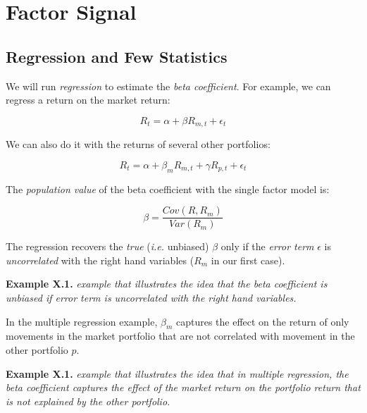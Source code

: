 \chapter{Factor Signal}

\section{Regression and Few Statistics}

We will run \textit{regression} to estimate the 
\textit{beta coefficient}. For example, we can 
regress a return on the market return:

\begin{equation}
    R_{t} = \alpha + \beta R_{m,t} + \epsilon_{t}
\end{equation}

We can also do it with the returns of several other portfolios:

\begin{equation}
    R_{t} = \alpha + \beta_m R_{m,t} + \gamma R_{p,t} + \epsilon_{t}
\end{equation}

The \textit{population value} of the beta coefficient with the single factor model is:

\begin{equation}
    \beta = \frac{Cov(R,R_m)}{Var(R_m)}
\end{equation}

The regression recovers the \textit{true} (\textit{i.e.} unbiased) 
$\beta$ only if the \textit{error term} $\epsilon$ is \textit{uncorrelated}
with the right hand variables ($R_m$ in our first case).

\begin{examplebox}
    \textbf{Example X.1.} 
    \textit{example that illustrates the idea
    that the beta coefficient is unbiased if 
    error term is uncorrelated with the right hand variables.}
\end{examplebox}

In the multiple regression example, 
$\beta_m$ captures the effect on the return of only movements in the market portfolio 
that are not correlated with movement in the other portfolio $p$.

\begin{examplebox}
\textbf{Example X.1.} 
\textit{example that illustrates the idea 
that in multiple regression, 
the beta coefficient captures the effect of the
market return on the portfolio return that is not
explained by the other portfolio.}
\end{examplebox}

